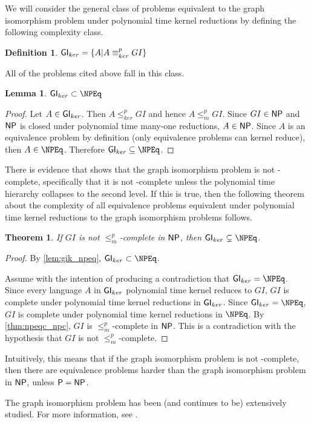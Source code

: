 \documentclass{amsart}
\newtheorem{theorem}{Theorem}[section]
\newtheorem{lemma}[lemma]{Lemma}
\theoremstyle{definition} \newtheorem{definition}[definition]{Definition}
\newcommand{\kr}{\leq^{p}_{ker}} %
\newcommand{\kequiv}{\equiv^{p}_{ker}} %
\newcommand{\mor}{\leq^{p}_{m}} %
\begin{document}
We will consider the general class of problems equivalent to the graph
isomorphism problem under polynomial time kernel reductions by defining the
following complexity class.

\begin{definition}
  $\GIk=\{A|A\kequiv GI\}$
\end{definition}

All of the problems cited above fall in this class.

\begin{lemma}\label{lem:gik_npeq}
  $\GIk\subset\NPEq$
\end{lemma}
\begin{proof}
  Let $A\in{\ensuremath{\mathsf{GI}}}_{ker}$. Then $A\kr GI$ and hence $A\mor GI$. Since $GI\in{\ensuremath{\mathsf{NP}}}$ and
  ${\mathsf{NP}}$ is closed under polynomial time many-one reductions, $A\in{\ensuremath{\mathsf{NP}}}$. Since
  $A$ is an equivalence problem by definition (only equivalence problems can
  kernel reduce), then $A\in\NPEq$. Therefore $\GIk\subseteq\NPEq$.
\end{proof}

There is evidence that shows that the graph isomorphism problem is not
\NP-complete, specifically that it is not \NP-complete unless the polynomial
time hierarchy collapses to the second level\cite{schoning87}. If this is true,
then the following theorem about the complexity of all equivalence problems
equivalent under polynomial time kernel reductions to the graph isomorphism
problems follows.

\begin{theorem}
  If $GI$ is not $\mor$-complete in ${\mathsf{NP}}$, then $\GIk\subsetneq\NPEq$.
\end{theorem}
\begin{proof}
  By \autoref{lem:gik_npeq}, $\GIk\subset\NPEq$.

  Assume with the intention of producing a contradiction that
  $\GIk=\NPEq$. Since every language $A$ in ${\mathsf{GI}}_{ker}$ polynomial time kernel
  reduces to $GI$, $GI$ is complete under polynomial time kernel reductions in
  ${\mathsf{GI}}_{ker}$. Since $\GIk=\NPEq$, $GI$ is complete under polynomial time kernel
  reductions in $\NPEq$. By \autoref{thm:npeqc_npc}, $GI$ is $\mor$-complete in
  ${\mathsf{NP}}$. This is a contradiction with the hypothesis that $GI$ is not
  $\mor$-complete.
\end{proof}
Intuitively, this means that if the graph isomorphism problem is not
\NP-complete, then there are equivalence problems harder than the graph
isomorphism problem in ${\mathsf{NP}}$, unless ${\mathsf{P}}={\mathsf{NP}}$.

The graph isomorphism problem has been (and continues to be) extensively
studied. For more information, see \cite{kst93}.
\end{document}
